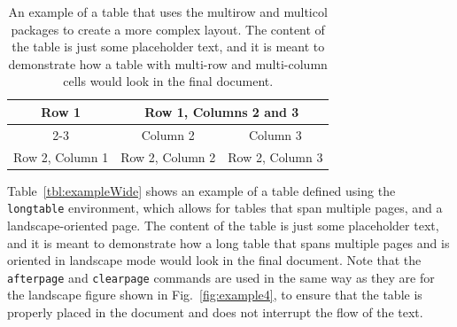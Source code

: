 \begin{table}[htbp]
	\centering
	\caption{An example of a table that uses the multirow and multicol packages to create a more complex layout. The content of the table is just some placeholder text, and it is meant to demonstrate how a table with multi-row and multi-column cells would look in the final document.}
	\label{tbl:example}
	\begin{tabular}{|c|c|c|}
		\hline
		\multirow{2}{*}{Row 1} & \multicolumn{2}{c|}{Row 1, Columns 2 and 3} \\
		\cline{2-3}
		& Column 2 & Column 3 \\
		\hline
		Row 2, Column 1 & Row 2, Column 2 & Row 2, Column 3 \\
		\hline
	\end{tabular}
\end{table}

Table~\ref{tbl:exampleWide} shows an example of a table defined using the \texttt{longtable} environment, which allows for tables that span multiple pages, and a landscape-oriented page. The content of the table is just some placeholder text, and it is meant to demonstrate how a long table that spans multiple pages and is oriented in landscape mode would look in the final document. Note that the \texttt{afterpage} and \texttt{clearpage} commands are used in the same way as they are for the landscape figure shown in Fig.~\ref{fig:example4}, to ensure that the table is properly placed in the document and does not interrupt the flow of the text.


